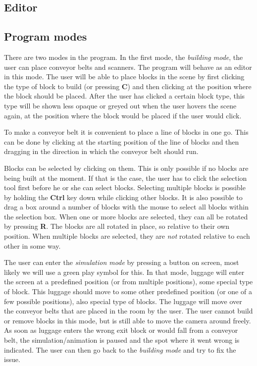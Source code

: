 \subsection{Editor}
\label{subsec:editor}


\subsection{Program modes}
\label{subsec:program-modes}
There are two modes in the program. In the first mode, the \textit{building mode}, the user can place conveyor belts and scanners. The program will behave as an editor in this mode. The user will be able to place blocks in the scene by first clicking the type of block to build (or pressing \textbf{C}) and then clicking at the position where the block should be placed. After the user has clicked a certain block type, this type will be shown less opaque or greyed out when the user hovers the scene again, at the position where the block would be placed if the user would click.

To make a conveyor belt it is convenient to place a line of blocks in one go. This can be done by clicking at the starting position of the line of blocks and then dragging in the direction in which the conveyor belt should run.

Blocks can be selected by clicking on them. This is only possible if no blocks are being built at the moment. If that is the case, the user has to click the selection tool first before he or she can select blocks. Selecting multiple blocks is possible by holding the \textbf{Ctrl} key down while clicking other blocks. It is also possible to drag a box around a number of blocks with the mouse to select all blocks within the selection box. When one or more blocks are selected, they can all be rotated by pressing \textbf{R}. The blocks are all rotated in place, so relative to their own position. When multiple blocks are selected, they are \emph{not} rotated relative to each other in some way.

The user can enter the \textit{simulation mode} by pressing a button on screen, most likely we will use a green play symbol for this. In that mode, luggage will enter the screen at a predefined position (or from multiple positions), some special type of block. This luggage should move to some other predefined position (or one of a few possible positions), also special type of blocks. The luggage will move over the conveyor belts that are placed in the room by the user. The user cannot build or remove blocks in this mode, but is still able to move the camera around freely. As soon as luggage enters the wrong exit block or would fall from a conveyor belt, the simulation/animation is paused and the spot where it went wrong is indicated. The user can then go back to the \textit{building mode} and try to fix the issue.

